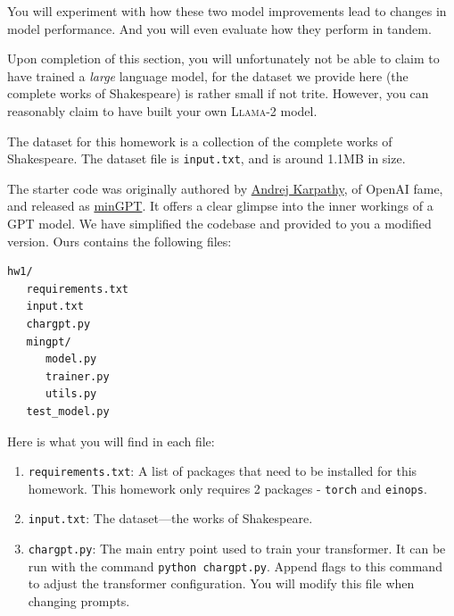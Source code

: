 \documentclass[11pt,addpoints,answers]{exam}
\begin{document}
\begin{questions}
You will experiment with how these two model improvements lead to changes in model performance. And you will even evaluate how they perform in tandem.

Upon completion of this section, you will unfortunately not be able to claim to have trained a \emph{large} language model, for the dataset we provide here (the complete works of Shakespeare) is rather small if not trite. However, you can reasonably claim to have built your own \textsc{Llama}-2 model.


 The dataset for this homework is a collection of the complete works of Shakespeare. The dataset file is \lstinline{input.txt}, and is around 1.1MB in size. 

 The starter code was originally authored by \href{https://karpathy.ai/}{Andrej Karpathy}, of OpenAI fame, and released as \href{https://github.com/karpathy/minGPT}{minGPT}. It offers a clear glimpse into the inner workings of a GPT model. We have simplified the codebase and provided to you a modified version. Ours contains the following files:
\begin{verbatim}
hw1/
   requirements.txt
   input.txt
   chargpt.py
   mingpt/
      model.py
      trainer.py
      utils.py
   test_model.py
\end{verbatim}
Here is what you will find in each file:
\begin{enumerate}
    
    \item \lstinline{requirements.txt}: A list of packages that need to be installed for this homework. This homework only requires 2 packages - \lstinline{torch} and \lstinline{einops}.
    
    \item \lstinline{input.txt}: The dataset---the works of Shakespeare.
    
    \item \lstinline{chargpt.py}: The main entry point used to train your transformer. It can be run with the command \lstinline{python chargpt.py}. Append flags to this command to adjust the transformer configuration. You will modify this file when changing prompts.
    

\end{enumerate}
\end{questions}
\end{document}
